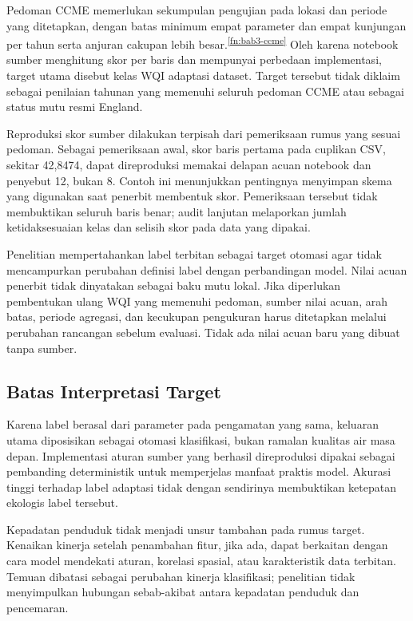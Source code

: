 Pedoman CCME memerlukan sekumpulan pengujian pada lokasi dan periode yang ditetapkan, dengan batas minimum empat parameter dan empat kunjungan per tahun serta anjuran cakupan lebih besar.\textsuperscript{\ref{fn:bab3-ccme}} Oleh karena notebook sumber menghitung skor per baris dan mempunyai perbedaan implementasi, target utama disebut kelas WQI adaptasi dataset. Target tersebut tidak diklaim sebagai penilaian tahunan yang memenuhi seluruh pedoman CCME atau sebagai status mutu resmi England.

Reproduksi skor sumber dilakukan terpisah dari pemeriksaan rumus yang sesuai pedoman. Sebagai pemeriksaan awal, skor baris pertama pada cuplikan CSV, sekitar 42,8474, dapat direproduksi memakai delapan acuan notebook dan penyebut 12, bukan 8. Contoh ini menunjukkan pentingnya menyimpan skema yang digunakan saat penerbit membentuk skor. Pemeriksaan tersebut tidak membuktikan seluruh baris benar; audit lanjutan melaporkan jumlah ketidaksesuaian kelas dan selisih skor pada data yang dipakai.

Penelitian mempertahankan label terbitan sebagai target otomasi agar tidak mencampurkan perubahan definisi label dengan perbandingan model. Nilai acuan penerbit tidak dinyatakan sebagai baku mutu lokal. Jika diperlukan pembentukan ulang WQI yang memenuhi pedoman, sumber nilai acuan, arah batas, periode agregasi, dan kecukupan pengukuran harus ditetapkan melalui perubahan rancangan sebelum evaluasi. Tidak ada nilai acuan baru yang dibuat tanpa sumber.

\subsection{Batas Interpretasi Target}

Karena label berasal dari parameter pada pengamatan yang sama, keluaran utama diposisikan sebagai otomasi klasifikasi, bukan ramalan kualitas air masa depan. Implementasi aturan sumber yang berhasil direproduksi dipakai sebagai pembanding deterministik untuk memperjelas manfaat praktis model. Akurasi tinggi terhadap label adaptasi tidak dengan sendirinya membuktikan ketepatan ekologis label tersebut.

Kepadatan penduduk tidak menjadi unsur tambahan pada rumus target. Kenaikan kinerja setelah penambahan fitur, jika ada, dapat berkaitan dengan cara model mendekati aturan, korelasi spasial, atau karakteristik data terbitan. Temuan dibatasi sebagai perubahan kinerja klasifikasi; penelitian tidak menyimpulkan hubungan sebab-akibat antara kepadatan penduduk dan pencemaran.

